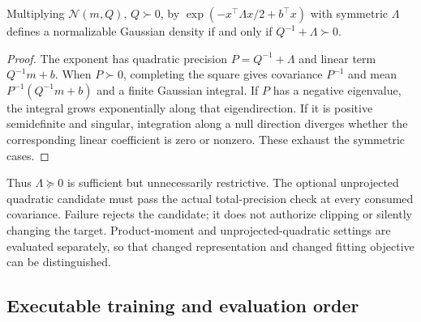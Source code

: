 \begin{proposition}
\label{prop:sg-quadratic-domain}
Multiplying $\mathcal N(m,Q)$, $Q\succ0$, by
$\exp(-x^\top\Lambda x/2+b^\top x)$ with symmetric $\Lambda$
defines a normalizable Gaussian density if and only if
$Q^{-1}+\Lambda\succ0$.
\end{proposition}
\begin{proof}
The exponent has quadratic precision $P=Q^{-1}+\Lambda$ and linear term
$Q^{-1}m+b$. When $P\succ0$, completing the square gives covariance
$P^{-1}$ and mean $P^{-1}(Q^{-1}m+b)$ and a finite Gaussian integral.
If $P$ has a negative eigenvalue, the integral grows exponentially along
that eigendirection. If it is positive semidefinite and singular, integration
along a null direction diverges whether the corresponding linear coefficient
is zero or nonzero. These exhaust the symmetric cases.
\end{proof}

Thus $\Lambda\succeq0$ is sufficient but unnecessarily restrictive. The
optional unprojected quadratic candidate must pass the actual total-precision
check at every consumed covariance. Failure rejects the candidate; it does
not authorize clipping or silently changing the target. Product-moment and
unprojected-quadratic settings are evaluated separately, so that changed
representation and changed fitting objective can be distinguished.

\subsection{Executable training and evaluation order}


